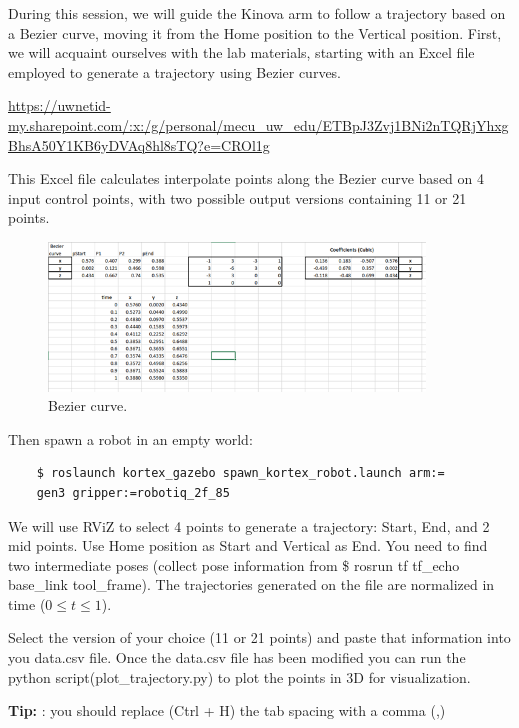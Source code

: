\documentclass[12pt]{article}
\begin{document}
During this session, we will guide the Kinova arm to follow a trajectory based on a Bezier curve, moving it from the Home position to the Vertical position. First, we will acquaint ourselves with the lab materials, starting with an Excel file employed to generate a trajectory using Bezier curves. 

\url{https://uwnetid-my.sharepoint.com/:x:/g/personal/mecu_uw_edu/ETBpJ3Zvj1BNi2nTQRjYhxgBhsA50Y1KB6yDVAq8hl8sTQ?e=CROl1g}

This Excel file calculates interpolate points along the Bezier curve based on 4 input control points, with two possible output versions containing 11 or 21 points.

\begin{figure}[H]
    \vspace{-10pt}
    \centering\includegraphics[width=10cm]{images/lab71.png}\vspace{-10pt}
    \caption{Bezier curve.}\label{fig:curves}
    \end{figure}

Then spawn a robot in an empty world:

\begin{verbatim}
    $ roslaunch kortex_gazebo spawn_kortex_robot.launch arm:=
    gen3 gripper:=robotiq_2f_85
    \end{verbatim}

We will use RViZ to select 4 points to generate a trajectory: Start, End, and 2 mid points. Use Home position as Start and Vertical as End. You need to find two intermediate poses (collect pose information from \$ rosrun tf tf\_echo base\_link tool\_frame). 
The trajectories generated on the file are normalized in time ($0 \leqslant t \leqslant 1$). 

Select the version of your choice (11 or 21 points) and paste that information into you data.csv file. Once the data.csv file has been modified you can run the python script(plot\_trajectory.py) to plot the points in 3D for visualization.

\textbf{Tip:} : you should replace (Ctrl + H) the tab spacing with a comma (,)
\end{document}
